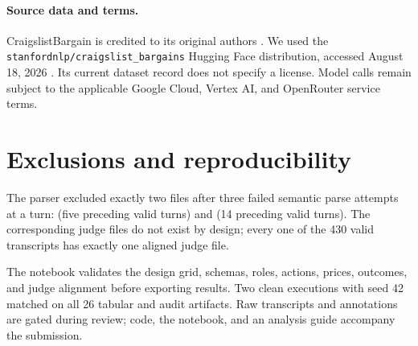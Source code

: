 \documentclass{article}
\begin{document}
\paragraph{Source data and terms.}
CraigslistBargain is credited to its original authors
\citep{he2018decoupling}. We used the
\texttt{stanfordnlp/craigslist\_bargains} Hugging Face distribution, accessed
August 18, 2026 \citep{stanfordnlp2026craigslist}. Its current dataset record
does not specify a license. Model calls remain subject to the applicable Google
Cloud, Vertex AI, and OpenRouter service terms.

\FloatBarrier

\section{Exclusions and reproducibility}
\label{app:reproducibility}

\begingroup\raggedright
The parser excluded exactly two files after three failed semantic parse
attempts at a turn: 
(five preceding valid turns) and
 (14 preceding valid turns).
The corresponding judge files do not exist by design; every one of the
430 valid transcripts has exactly one aligned judge file.\par
\endgroup

The notebook validates the design grid, schemas, roles, actions, prices,
outcomes, and judge alignment before exporting results. Two clean executions
with seed 42 matched on all 26 tabular and audit artifacts. Raw transcripts and
annotations are gated during review; code, the notebook, and an analysis guide
accompany the submission.

\clearpage

\end{document}

